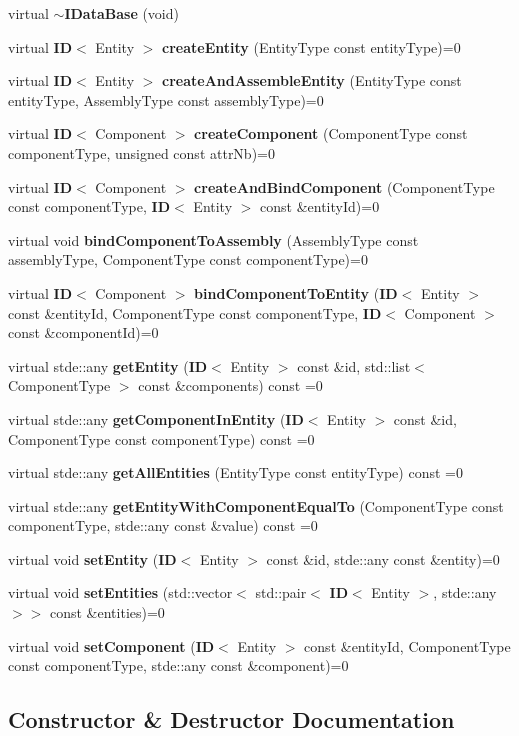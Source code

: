 \begin{DoxyCompactItemize}
\item 
virtual {\bf $\sim$\+I\+Data\+Base} (void)
\item 
virtual {\bf ID}$<$ Entity $>$ {\bf create\+Entity} (Entity\+Type const entity\+Type)=0
\item 
virtual {\bf ID}$<$ Entity $>$ {\bf create\+And\+Assemble\+Entity} (Entity\+Type const entity\+Type, Assembly\+Type const assembly\+Type)=0
\item 
virtual {\bf ID}$<$ Component $>$ {\bf create\+Component} (Component\+Type const component\+Type, unsigned const attr\+Nb)=0
\item 
virtual {\bf ID}$<$ Component $>$ {\bf create\+And\+Bind\+Component} (Component\+Type const component\+Type, {\bf ID}$<$ Entity $>$ const \&entity\+Id)=0
\item 
virtual void {\bf bind\+Component\+To\+Assembly} (Assembly\+Type const assembly\+Type, Component\+Type const component\+Type)=0
\item 
virtual {\bf ID}$<$ Component $>$ {\bf bind\+Component\+To\+Entity} ({\bf ID}$<$ Entity $>$ const \&entity\+Id, Component\+Type const component\+Type, {\bf ID}$<$ Component $>$ const \&component\+Id)=0
\item 
virtual stde\+::any {\bf get\+Entity} ({\bf ID}$<$ Entity $>$ const \&id, std\+::list$<$ Component\+Type $>$ const \&components) const =0
\item 
virtual stde\+::any {\bf get\+Component\+In\+Entity} ({\bf ID}$<$ Entity $>$ const \&id, Component\+Type const component\+Type) const =0
\item 
virtual stde\+::any {\bf get\+All\+Entities} (Entity\+Type const entity\+Type) const =0
\item 
virtual stde\+::any {\bf get\+Entity\+With\+Component\+Equal\+To} (Component\+Type const component\+Type, stde\+::any const \&value) const =0
\item 
virtual void {\bf set\+Entity} ({\bf ID}$<$ Entity $>$ const \&id, stde\+::any const \&entity)=0
\item 
virtual void {\bf set\+Entities} (std\+::vector$<$ std\+::pair$<$ {\bf ID}$<$ Entity $>$, stde\+::any $>$$>$ const \&entities)=0
\item 
virtual void {\bf set\+Component} ({\bf ID}$<$ Entity $>$ const \&entity\+Id, Component\+Type const component\+Type, stde\+::any const \&component)=0
\end{DoxyCompactItemize}


\subsection{Constructor \& Destructor Documentation}
\label{classentity__component__system_1_1database_1_1_i_data_base_abcbd6e03736ab22392af6a5af784744e} 
